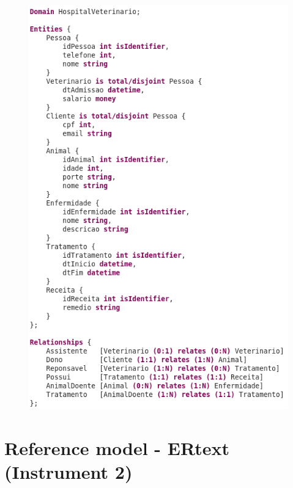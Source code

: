 \begin{figure}[!htb]
    \centering
    \includegraphics[scale=0.5]{postextuais/appendix/Instrument1-ReferenceModel-ERtext.png}
    \label{fig:referenceModelERtextInst1}
\end{figure}

\newpage

\section{Reference model - ERtext (Instrument 2)}

